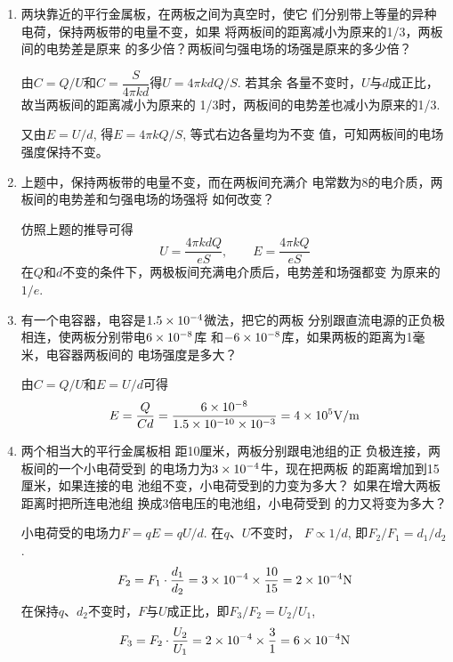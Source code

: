 \begin{enumerate}
\item 两块靠近的平行金属板，在两板之间为真空时，使它
们分别带上等量的异种电荷，保持两板带的电量不变，如果
将两板间的距离减小为原来的1/3，两板间的电势差是原来
的多少倍？两板间匀强电场的场强是原来的多少倍？

\begin{solution}
    由$C=Q/U$和$C=\dfrac{S}{4\pi kd}$得$U=4\pi kdQ/S$. 若其余
    各量不变时，$U$与$d$成正比，故当两板间的距离减小为原来的
    1/3时，两板间的电势差也减小为原来的1/3.

    又由$E=U/d$, 得$E=4\pi kQ/S$, 等式右边各量均为不变
值，可知两板间的电场强度保持不变。
\end{solution}

\item 上题中，保持两板带的电量不变，而在两板间充满介
电常数为8的电介质，两板间的电势差和匀强电场的场强将
如何改变？

\begin{solution}
    仿照上题的推导可得
    \[U=\frac{4\pi kdQ}{eS},\qquad E=\frac{4\pi kQ}{eS}\]
    在$Q$和$d$不变的条件下，两极板间充满电介质后，电势差和场强都变
    为原来的$1/e$.
\end{solution}

\item 有一个电容器，电容是$1.5\times10^{-4}$微法，把它的两板
分别跟直流电源的正负极相连，使两板分别带电$6\times10^{-8}$库
和$-6\times10^{-8}$库，如果两板的距离为1毫米，电容器两板间的
电场强度是多大？

\begin{solution}
    由$C=Q/U$和$E=U/d$可得
\[E=\frac{Q}{Cd}=\frac{6\times 10^{-8}}{1.5\times 10^{-10}\times 10^{-3}}=4\times 10^{5}{\rm V/m}\]
\end{solution}

\item 两个相当大的平行金属板相
距10厘米，两板分别跟电池组的正
负极连接，两板间的一个小电荷受到
的电场力为$3\times10^{-4}$牛，现在把两板
的距离增加到15厘米，如果连接的电
池组不变，小电荷受到的力变为多大？
如果在增大两板距离时把所连电池组
换成3倍电压的电池组，小电荷受到
的力又将变为多大？

\begin{solution}
    小电荷受的电场力$F=qE=qU/d$. 在$q$、$U$不变时，
    $F\propto 1/d$, 即$F_2/F_1=d_1/d_2$.
\[F_2=F_1\cdot \frac{d_1}{d_2}=3\times 10^{-4}\times \frac{10}{15}=2\times 10^{-4}{\rm N}\]
在保持$q$、$d_2$不变时，$F$与$U$成正比，即$F_3/F_2=U_2/U_1$,
\[F_3=F_2\cdot \frac{U_2}{U_1}=2\times 10^{-4}\times \frac{3}{1}=6\times 10^{-4}{\rm N}\]
\end{solution}



\end{enumerate}

